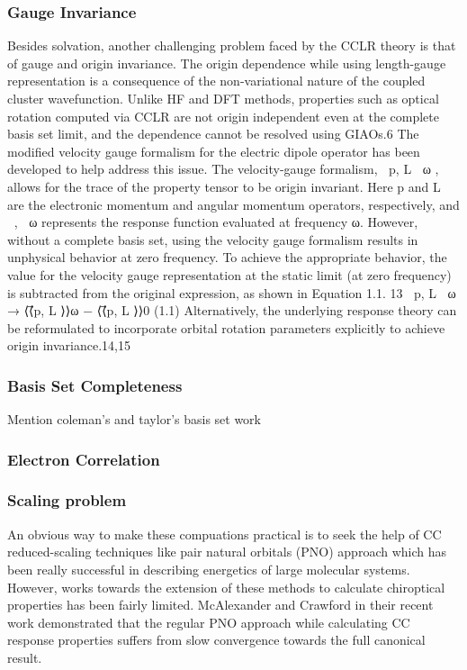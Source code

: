 \subsubsection{Gauge Invariance}
Besides solvation, another challenging problem faced by the CCLR theory is that of 
gauge and origin invariance.
The origin dependence while using length-gauge representation is a consequence of the non-variational nature of the 
coupled cluster wavefunction. Unlike HF and DFT methods, properties such as optical rotation computed via CCLR 
are not origin independent even at the complete basis set limit, and the dependence cannot be resolved using GIAOs.6 
The modified velocity gauge formalism for the electric dipole operator has been developed to help address this 
issue. The velocity-gauge formalism, ⟨⟨⃗p, L⃗ ⟩⟩ω , allows for the trace of the property tensor to be origin 
invariant. Here ⃗p and L⃗ are the electronic momentum and angular momentum operators, respectively, and 
⟨⟨, ⟩⟩ω represents the response function evaluated at frequency ω. However, without a complete basis
set, using the velocity gauge formalism results in unphysical behavior at zero frequency. To achieve the 
appropriate behavior, the value for the velocity gauge representation at the static limit (at zero frequency) 
is subtracted from the original expression, as shown in Equation 1.1. 13
⟨⟨⃗p, L⃗ ⟩⟩ω → ⟨⟨⃗p, L⃗ ⟩⟩ω − ⟨⟨⃗p, L⃗ ⟩⟩0 (1.1) Alternatively, the underlying response theory can be reformulated to incorporate 
orbital rotation parameters explicitly to achieve origin invariance.14,15

\subsubsection{Basis Set Completeness}
Mention coleman's and taylor's basis set work 

\subsubsection{Electron Correlation}

\subsubsection{Scaling problem}
An obvious way to make these compuations practical is to seek the help of CC reduced-scaling 
techniques like pair natural orbitals (PNO) approach\cite{Neese09,NeeseCCSD09} which has been really successful in describing energetics of 
large molecular systems. However, works towards the extension of these methods to calculate chiroptical properties has been 
fairly limited\cite{Gauss00,Korona04,Russ04,McAlexander12,Friedrich15,Russ08}. McAlexander and Crawford in their recent 
work\cite{McAlexander15:LRCC} demonstrated that the regular PNO approach while calculating CC response properties 
suffers from slow convergence towards the full canonical result. \\\\

